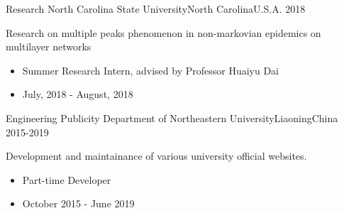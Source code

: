 \begin{experiences}
	\experience
	{Research}   {North Carolina State University}{North Carolina}{U.S.A.}
	{2018} {
		Research on multiple peaks phenomenon in non-markovian epidemics on multilayer networks
		\begin{itemize}
			\item Summer Research Intern, advised by Professor Huaiyu Dai
			\item July, 2018 - August, 2018
		\end{itemize}
	}
	{}

	\experience
	{Engineering} {Publicity Department of Northeastern University}{Liaoning}{China}
	{2015-2019}    {
		Development and maintainance of various university official websites.
		\begin{itemize}
			\item Part-time Developer
			\item October 2015 - June 2019
		\end{itemize}
	}
	{}
\end{experiences}
